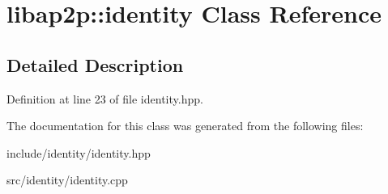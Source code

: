 \hypertarget{classlibap2p_1_1identity}{\section{libap2p\-:\-:identity Class Reference}
\label{classlibap2p_1_1identity}
}


\subsection{Detailed Description}


Definition at line 23 of file identity.\-hpp.



The documentation for this class was generated from the following files\-:\begin{DoxyCompactItemize}
\item 
include/identity/identity.\-hpp\item 
src/identity/identity.\-cpp\end{DoxyCompactItemize}
